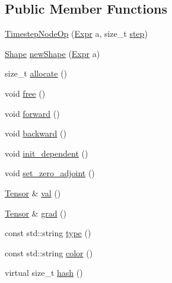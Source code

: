 \subsection*{Public Member Functions}
\begin{DoxyCompactItemize}
\item 
\hyperlink{classmarian_1_1TimestepNodeOp_ab613494bd1a3df6657a9723c514298c9}{Timestep\+Node\+Op} (\hyperlink{namespacemarian_a498d8baf75b754011078b890b39c8e12}{Expr} a, size\+\_\+t \hyperlink{namespacemarian_a2e7193e67292a4c3347f296f5e669581}{step})
\item 
\hyperlink{structmarian_1_1Shape}{Shape} \hyperlink{classmarian_1_1TimestepNodeOp_af59462293088e6859217d6436b929bd3}{new\+Shape} (\hyperlink{namespacemarian_a498d8baf75b754011078b890b39c8e12}{Expr} a)
\item 
size\+\_\+t \hyperlink{classmarian_1_1TimestepNodeOp_ac014b5b002e36eeefccfaf4939d2a535}{allocate} ()
\item 
void \hyperlink{classmarian_1_1TimestepNodeOp_a0c4ed1e755023af411edc66c20f7f816}{free} ()
\item 
void \hyperlink{classmarian_1_1TimestepNodeOp_abe5db4fc2772dbe3692475450cdb7643}{forward} ()
\item 
void \hyperlink{classmarian_1_1TimestepNodeOp_a008635706bbc2acd247d2488a856fba9}{backward} ()
\item 
void \hyperlink{classmarian_1_1TimestepNodeOp_a64818c7734019fc042d3712f07e3b087}{init\+\_\+dependent} ()
\item 
void \hyperlink{classmarian_1_1TimestepNodeOp_a41bff17de35cad13c3c9492a862ac944}{set\+\_\+zero\+\_\+adjoint} ()
\item 
\hyperlink{namespacemarian_a88b71ec34bb354564cddc24eb80f7e14}{Tensor} \& \hyperlink{classmarian_1_1TimestepNodeOp_a9d16e5a4d7b7359c4b4e230500a45343}{val} ()
\item 
\hyperlink{namespacemarian_a88b71ec34bb354564cddc24eb80f7e14}{Tensor} \& \hyperlink{classmarian_1_1TimestepNodeOp_a02af0c9c13e16888c53deb7032061d1d}{grad} ()
\item 
const std\+::string \hyperlink{classmarian_1_1TimestepNodeOp_a2624a53aaedf5c6838cab594c2f65229}{type} ()
\item 
const std\+::string \hyperlink{classmarian_1_1TimestepNodeOp_a2beedbe285b4c1f5b5528d0d2f406ae1}{color} ()
\item 
virtual size\+\_\+t \hyperlink{classmarian_1_1TimestepNodeOp_a43f50885f973fe1e849f1c940eeb2107}{hash} ()
\end{DoxyCompactItemize}
